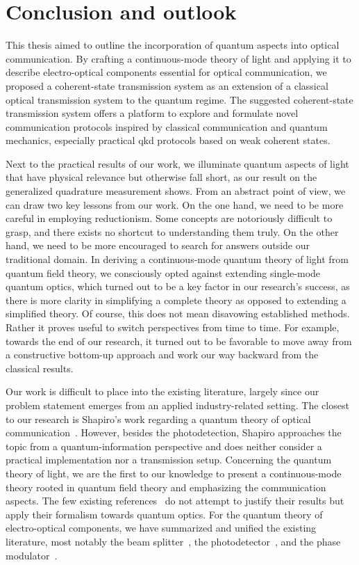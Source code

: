 \chapter*{Conclusion and outlook}

This thesis aimed to outline the incorporation of quantum aspects into optical communication.
By crafting a continuous-mode theory of light and applying it to describe electro-optical components essential for optical communication, we proposed a coherent-state transmission system as an extension of a classical optical transmission system to the quantum regime.
The suggested coherent-state transmission system offers a platform to explore and formulate novel communication protocols inspired by classical communication and quantum mechanics, especially practical \gls{qkd} protocols based on weak coherent states.

Next to the practical results of our work, we illuminate quantum aspects of light that have physical relevance but otherwise fall short, as our result on the generalized quadrature measurement shows.
From an abstract point of view, we can draw two key lessons from our work.
On the one hand, we need to be more careful in employing reductionism.
Some concepts are notoriously difficult to grasp, and there exists no shortcut to understanding them truly.
On the other hand, we need to be more encouraged to search for answers outside our traditional domain.
In deriving a continuous-mode quantum theory of light from quantum field theory, we consciously opted against extending single-mode quantum optics, which turned out to be a key factor in our research's success, as there is more clarity in simplifying a complete theory as opposed to extending a simplified theory.
Of course, this does not mean disavowing established methods.
Rather it proves useful to switch perspectives from time to time.
For example, towards the end of our research, it turned out to be favorable to move away from a constructive bottom-up approach and work our way backward from the classical results.

Our work is difficult to place into the existing literature, largely since our problem statement emerges from an applied industry-related setting.
The closest to our research is Shapiro's work regarding a quantum theory of optical communication~\cite{Shapiro2009}.
However, besides the photodetection, Shapiro approaches the topic from a quantum-information perspective and does neither consider a practical implementation nor a transmission setup.
Concerning the quantum theory of light, we are the first to our knowledge to present a continuous-mode theory rooted in quantum field theory and emphasizing the communication aspects.
The few existing references~\cite{Barnett2002,Loudon2000} do not attempt to justify their results but apply their formalism towards quantum optics.
For the quantum theory of electro-optical components, we have summarized and unified the existing literature, most notably the beam splitter~\cite{Haroche2006,Leonhardt2003,Vogel2006}, the photodetector~\cite{Vogel2006,Mandel1995,Shapiro2009}, and the phase modulator~\cite{Horoshko2018,QuesadaMejia2015}.

